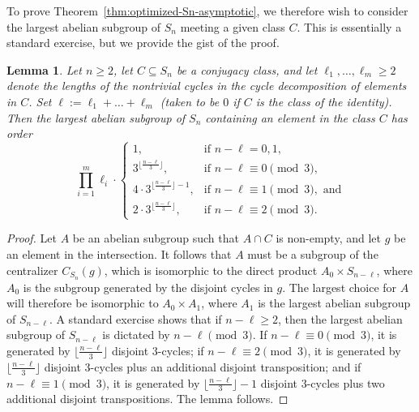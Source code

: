 \documentclass[12pt]{amsart}
\newtheorem{lemma}[theorem]{Lemma}
\theoremstyle{definition} \newtheorem{definition}[theorem]{Definition}
\theoremstyle{example} \newtheorem{example}[theorem]{Example}
\theoremstyle{remark} \newtheorem{remark}{Remark}[theorem]
\numberwithin{equation}{section}
\numberwithin{theorem}{section}
\renewcommand{\geq}{\geqslant}
\begin{document}
	To prove Theorem~\ref{thm:optimized-Sn-asymptotic}, we therefore wish to consider the largest abelian subgroup of $S_n$ meeting a given class $C$.  This is essentially a standard exercise, but we provide the gist of the proof.
	
	\begin{lemma} \label{lem:abelian-bound}
			Let $n \geq 2$, let $C \subseteq S_n$ be a conjugacy class, and let $\ell_1,\dots,\ell_m \geq 2$ denote the lengths of the nontrivial cycles in the cycle decomposition of elements in $C$.  Set $\ell := \ell_1 + \dots + \ell_m$ (taken to be $0$ if $C$ is the class of the identity).  Then the largest abelian subgroup of $S_n$ containing an element in the class $C$ has order
				\[
					\prod_{i=1}^m \ell_i \cdot \begin{cases}
						1, & \text{if } n-\ell = 0,1, \\
						3^{\lfloor \frac{n-\ell}{3} \rfloor}, & \text{if } n-\ell \equiv 0 \pmod{3}, \\
						4 \cdot 3^{\lfloor \frac{n-\ell}{3} \rfloor - 1}, & \text{if } n-\ell \equiv 1 \pmod{3}, \text{ and}\\
						2 \cdot 3^{\lfloor \frac{n-\ell}{3} \rfloor}, & \text{if } n-\ell \equiv 2 \pmod{3}.
					\end{cases}
				\]
	\end{lemma}
	\begin{proof}
		Let $A$ be an abelian subgroup such that $A \cap C$ is non-empty, and let $g$ be an element in the intersection.  It follows that $A$ must be a subgroup of the centralizer $C_{S_n}(g)$, which is isomorphic to the direct product $A_0 \times S_{n-\ell}$, where $A_0$ is the subgroup generated by the disjoint cycles in $g$.  The largest choice for $A$ will therefore be isomorphic to $A_0 \times A_1$, where $A_1$ is the largest abelian subgroup of $S_{n-\ell}$.  A standard exercise shows that if $n-\ell \geq 2$, then the largest abelian subgroup of $S_{n-\ell}$ is dictated by $n-\ell \pmod{3}$.  If $n-\ell \equiv 0 \pmod{3}$, it is generated by $\lfloor \frac{n-\ell}{3}\rfloor$ disjoint $3$-cycles; if $n - \ell \equiv 2 \pmod{3}$, it is generated by $\lfloor \frac{n-\ell}{3}\rfloor$ disjoint $3$-cycles plus an additional disjoint transposition; and if $n-\ell \equiv 1 \pmod{3}$, it is generated by $\lfloor \frac{n-\ell}{3}\rfloor - 1$ disjoint $3$-cycles plus two additional disjoint transpositions.  The lemma follows.
	\end{proof}
	
\end{document}
